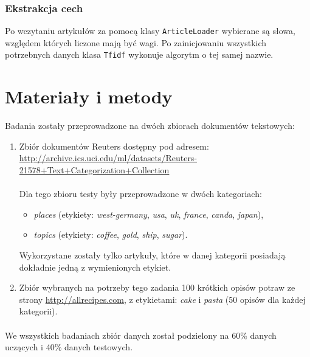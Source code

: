 \documentclass{classrep}
\begin{document}
{\subsubsection{Ekstrakcja cech}
Po wczytaniu artykułów za pomocą klasy \verb|ArticleLoader| wybierane są słowa, względem których liczone mają być wagi. Po zainicjowaniu wszystkich potrzebnych danych klasa \verb|Tfidf| wykonuje algorytm o tej samej nazwie.
}
\section{Materiały i metody}
{\color{blue} 
Badania zostały przeprowadzone na dwóch zbiorach dokumentów tekstowych:\\
\begin{enumerate}
\item Zbiór dokumentów Reuters dostępny pod adresem:\\ \url{http://archive.ics.uci.edu/ml/datasets/Reuters-21578+Text+Categorization+Collection}\\\\
Dla tego zbioru testy były przeprowadzone w dwóch kategoriach:

\begin{itemize}
\item \textit{places} (etykiety: \textit{west-germany}, \textit{usa}, \textit{uk}, \textit{france}, \textit{canda}, \textit{japan}),
\item \textit{topics} (etykiety: \textit{coffee}, \textit{gold}, \textit{ship}, \textit{sugar}).\\
\end{itemize}
Wykorzystane zostały tylko artykuły, które w danej kategorii posiadają dokładnie jedną z wymienionych etykiet.\\


\item Zbiór wybranych na potrzeby tego zadania 100 krótkich opisów potraw ze strony \url{http://allrecipes.com}, z etykietami: \textit{cake} i \textit{pasta} (50 opisów dla każdej kategorii).

\end{enumerate}

\paragraph{}
We wszystkich badaniach zbiór danych został podzielony na 60\% danych uczących i 40\% danych testowych.
}
\end{document}
